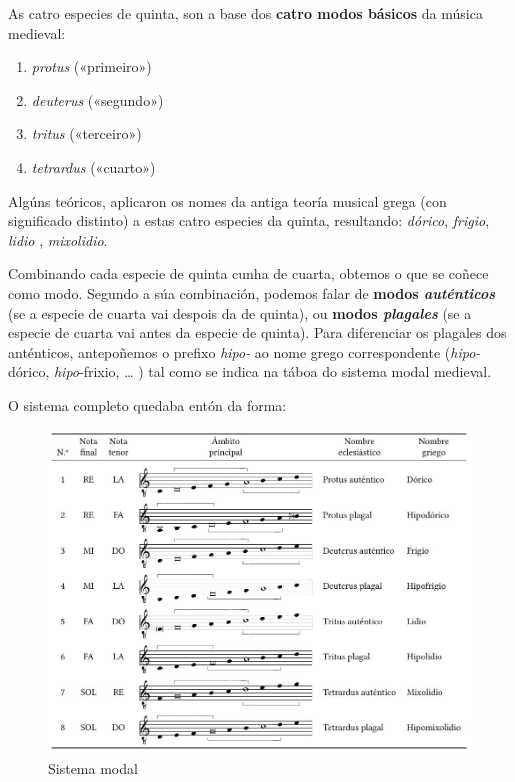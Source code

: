 \documentclass[spanish, a4paper,nobind]{templates/ociamthesis}
\providecommand{\tightlist}{%
  \setlength{\itemsep}{0pt}\setlength{\parskip}{0pt}}
\begin{document}
As catro especies de quinta, son a base dos \textbf{catro modos básicos} da música medieval:

\begin{enumerate}
\def\labelenumi{\arabic{enumi}.}
\tightlist
\item
  \emph{protus} («primeiro»)
\item
  \emph{deuterus} («segundo»)
\item
  \emph{tritus} («terceiro»)
\item
  \emph{tetrardus} («cuarto»)
\end{enumerate}

Algúns teóricos, aplicaron os nomes da antiga teoría musical grega (con significado distinto) a estas catro especies da quinta, resultando: \emph{dórico}, \emph{frigio}, \emph{lidio} , \emph{mixolidio}.

Combinando cada especie de quinta cunha de cuarta, obtemos o que se coñece como modo. Segundo a súa combinación, podemos falar de \textbf{modos \emph{auténticos}} (se a especie de cuarta vai despois da de quinta), ou \textbf{modos \emph{plagales}} (se a especie de cuarta vai antes da especie de quinta). Para diferenciar os plagales dos anténticos, antepoñemos o prefixo \emph{hipo-} ao nome grego correspondente (\emph{hipo-}dórico, \emph{hipo}-frixio, \ldots{} ) tal como se indica na táboa do sistema modal medieval.

O sistema completo quedaba entón da forma:

\begin{figure}
\centering
\includegraphics{figures/ud-03/sistema-modal.jpg}
\caption{Sistema modal}
\end{figure}
\end{document}
